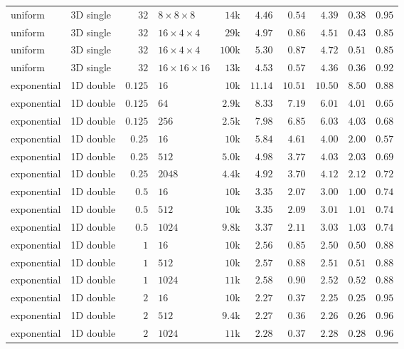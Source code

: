 {\begin{longtable}{llrlrrrrrr}
    uniform & 3D single & $32$ & $8{\times}8{\times}8$ & $14$k & $4.46$ & $0.54$ & $4.39$ & $0.38$ & $0.95$ \\
    uniform & 3D single & $32$ & $16{\times}4{\times}4$ & $29$k & $4.97$ & $0.86$ & $4.51$ & $0.43$ & $0.85$ \\
    uniform & 3D single & $32$ & $16{\times}4{\times}4$ & $100$k & $5.30$ & $0.87$ & $4.72$ & $0.51$ & $0.85$ \\
    uniform & 3D single & $32$ & $16{\times}16{\times}16$ & $13$k & $4.53$ & $0.57$ & $4.36$ & $0.36$ & $0.92$ \\
    \midrule
    exponential & 1D double & $0.125$ & $16$ & $10$k & $11.14$ & $10.51$ & $10.50$ & $8.50$ & $0.88$ \\
    exponential & 1D double & $0.125$ & $64$ & $2.9$k & $8.33$ & $7.19$ & $6.01$ & $4.01$ & $0.65$ \\
    exponential & 1D double & $0.125$ & $256$ & $2.5$k & $7.98$ & $6.85$ & $6.03$ & $4.03$ & $0.68$ \\
    exponential & 1D double & $0.25$ & $16$ & $10$k & $5.84$ & $4.61$ & $4.00$ & $2.00$ & $0.57$ \\
    exponential & 1D double & $0.25$ & $512$ & $5.0$k & $4.98$ & $3.77$ & $4.03$ & $2.03$ & $0.69$ \\
    exponential & 1D double & $0.25$ & $2048$ & $4.4$k & $4.92$ & $3.70$ & $4.12$ & $2.12$ & $0.72$ \\
    exponential & 1D double & $0.5$ & $16$ & $10$k & $3.35$ & $2.07$ & $3.00$ & $1.00$ & $0.74$ \\
    exponential & 1D double & $0.5$ & $512$ & $10$k & $3.35$ & $2.09$ & $3.01$ & $1.01$ & $0.74$ \\
    exponential & 1D double & $0.5$ & $1024$ & $9.8$k & $3.37$ & $2.11$ & $3.03$ & $1.03$ & $0.74$ \\
    exponential & 1D double & $1$ & $16$ & $10$k & $2.56$ & $0.85$ & $2.50$ & $0.50$ & $0.88$ \\
    exponential & 1D double & $1$ & $512$ & $10$k & $2.57$ & $0.88$ & $2.51$ & $0.51$ & $0.88$ \\
    exponential & 1D double & $1$ & $1024$ & $11$k & $2.58$ & $0.90$ & $2.52$ & $0.52$ & $0.88$ \\
    exponential & 1D double & $2$ & $16$ & $10$k & $2.27$ & $0.37$ & $2.25$ & $0.25$ & $0.95$ \\
    exponential & 1D double & $2$ & $512$ & $9.4$k & $2.27$ & $0.36$ & $2.26$ & $0.26$ & $0.96$ \\
    exponential & 1D double & $2$ & $1024$ & $11$k & $2.28$ & $0.37$ & $2.28$ & $0.28$ & $0.96$ \\

\end{longtable}}
